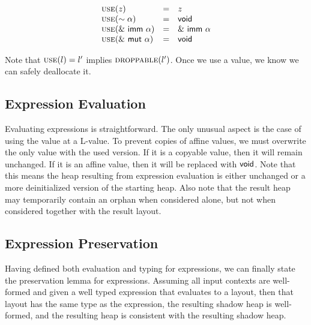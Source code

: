 
\[
\begin{array}{lcl}
\textsc{use}(z) &=& z \\
\textsc{use}(\sim{\alpha}) &=& \mathsf{void} \\
\textsc{use}(\&~{{\mathsf{imm}}~{\alpha}}) &=& \&~{{\mathsf{imm}}~{\alpha}} \\
\textsc{use}(\&~{{\mathsf{mut}}~{\alpha}}) &=& \mathsf{void}
\end{array}
\]

Note that $\textsc{use}(l) = l'$ implies $\textsc{droppable}(l')$.
Once we use a value, we know we can safely deallocate it.

\subsection*{Expression Evaluation}
Evaluating expressions is straightforward.
The only unusual aspect is the case of using the value at a L-value.
To prevent copies of affine values, we must overwrite the only value
with the used version. If it is a copyable value, then it will remain unchanged.
If it is an affine value, then it will be replaced with $\mathsf{void}$.
Note that this means the heap resulting from expression evaluation is either
unchanged or a more deinitialized version of the starting heap.
Also note that the result heap may temporarily contain an orphan when considered alone,
but not when considered together with the result layout.
\newline



\subsection*{Expression Preservation}
Having defined both evaluation and typing for expressions, we can finally
state the preservation lemma for expressions. Assuming all input contexts are
well-formed and given a well typed expression that evaluates to a layout,
then that layout has the same type as the expression, the resulting shadow heap
is well-formed, and the resulting heap is consistent with the resulting shadow heap.

